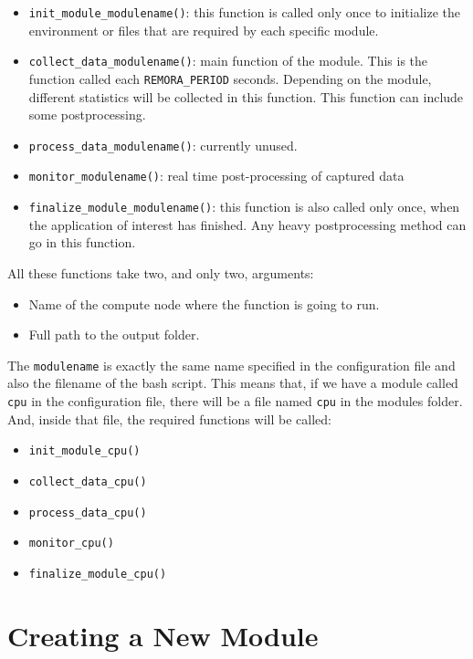 \documentclass[10pt,a4paper]{report}
\begin{document}
\begin{itemize}
	\item \texttt{init\_module\_modulename()}: this function is called only once to initialize the environment or files that are required by each specific module.
	\item \texttt{collect\_data\_modulename()}: main function of the module. This is the function called each \texttt{REMORA\_PERIOD} seconds. Depending on the module, different statistics will be collected in this function. This function can include some postprocessing.
	\item \texttt{process\_data\_modulename()}: currently unused.
	\item \texttt{monitor\_modulename()}: real time post-processing of captured data
	\item \texttt{finalize\_module\_modulename()}: this function is also called only once, when the application of interest has finished. Any heavy postprocessing method can go in this function.
\end{itemize}

All these functions take two, and only two, arguments:
\begin{itemize}
	\item Name of the compute node where the function is going to run.
	\item Full path to the output folder.
\end{itemize}

The \texttt{modulename} is exactly the same name specified in the configuration file and also the filename of the bash script. This means that, if we have a module called \texttt{cpu} in the configuration file, there will be a file named \texttt{cpu} in the modules folder. And, inside that file, the required functions will be called:

\begin{itemize}
	\item \texttt{init\_module\_cpu()}
	\item \texttt{collect\_data\_cpu()}
	\item \texttt{process\_data\_cpu()}
	\item \texttt{monitor\_cpu()}
	\item \texttt{finalize\_module\_cpu()}
\end{itemize}


\section{Creating a New Module}
\end{document}
